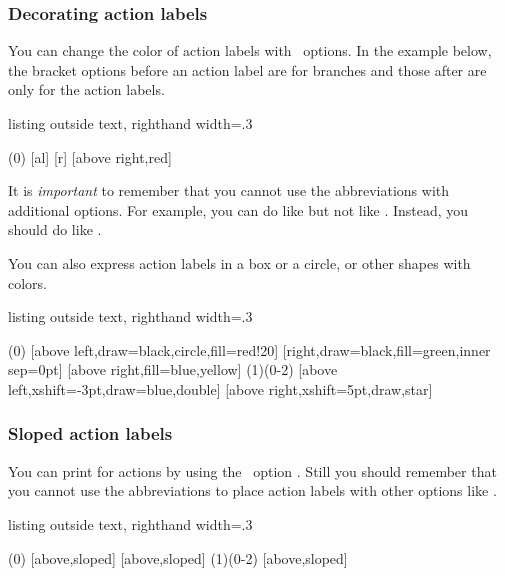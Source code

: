 \subsubsection{Decorating action labels}

You can change the color of action labels with \TikZ\ options. 
In the example below, the bracket options before an action label are for branches and those after are only for the action labels.

\begin{tcblisting}{listing outside text, righthand width=.3\linewidth}
\begin{istgame}
\istroot(0)
  [al]
  [r]
  [above right,red]
  \endist
\end{istgame}
\end{tcblisting}

\remark It is \emph{important} to remember that you cannot use the abbreviations with additional options. For example, you can do like  but not like . Instead, you should do like .

You can also express action labels in a box or a circle, or other shapes with colors.

\begin{tcblisting}{listing outside text, righthand width=.3\linewidth}
\begin{istgame}
\istroot(0)
  [above left,draw=black,circle,fill=red!20]
  [right,draw=black,fill=green,inner sep=0pt]
  [above right,fill=blue,yellow]
  \endist
\istroot(1)(0-2)
  [above left,xshift=-3pt,draw=blue,double]
  [above right,xshift=5pt,draw,star]
  \endist
\end{istgame}
\end{tcblisting}


\subsubsection{Sloped action labels}
\label{ssec:slopedlabels}

You can print  for actions by using the \TikZ\ option . 
Still you should remember that you cannot use the abbreviations to place action labels with other options like .

\begin{tcblisting}{listing outside text, righthand width=.3\linewidth}
\begin{istgame}
\istroot(0)
  [above,sloped]
  [above,sloped]      \endist
\istroot(1)(0-2)
  \istb{\text{\fbox{$\alpha$}}}[above,sloped]  
  \istb{\text{\fbox{$\beta$}}}  \endist
\end{istgame}
\end{tcblisting}

